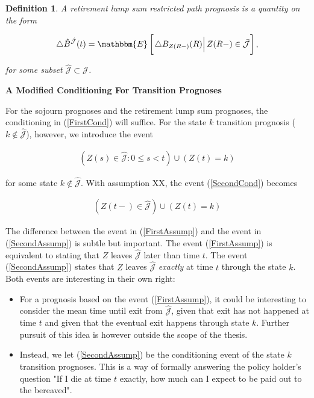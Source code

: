 \documentclass{article}
\newcommand{\1}[1]{\mathbbm{1}_{\left\lbrace #1 \right\rbrace}}
\newcommand{\econd}[2][def]{\mathbbm{E} \left[ \left. #1 \right| #2 \right]}
\theoremstyle{break}
\newtheorem{definition}{Definition}[section]
\theoremstyle{remark}
\numberwithin{equation}{section}
\begin{document}
\begin{definition} \label{DefLumpRestr}
	A retirement lump sum restricted path prognosis is a quantity on the form
	
	\begin{gather*}
		\triangle \hat{B}^{\hat{\mathcal{J}}}(t) = \econd[\triangle B_{Z(R-)}(R)]{Z(R-) \in \bar{\mathcal{J}}},
	\end{gather*}
	
	for some subset $\hat{\mathcal{J}} \subset \mathcal{J}$.
\end{definition}

\textbf{A Modified Conditioning For Transition Prognoses}

For the sojourn prognoses and the retirement lump sum prognoses, the conditioning in (\ref{FirstCond}) will suffice. For the state $k$ transition prognosis ($k \notin \hat{\mathcal{J}}$), however, we introduce the event

\begin{align} \label{SecondCond}
	\left( Z(s) \in \hat{\mathcal{J}} : 0 \leq s < t\right) \cup \left(Z(t) = k \right)
\end{align}

for some state $k \notin \hat{\mathcal{J}}$. With assumption XX, the event (\ref{SecondCond}) becomes

\begin{align} \label{SecondAssump}
	\left( Z(t-) \in \hat{\mathcal{J}}\right) \cup \left(Z(t) = k \right)
\end{align}

The difference between the event in (\ref{FirstAssump}) and the event in (\ref{SecondAssump}) is subtle but important. The event (\ref{FirstAssump}) is equivalent to stating that $Z$ leaves $ \hat{\mathcal{J}}$ later than time $t$. The event (\ref{SecondAssump}) states that $Z$ leaves $\hat{\mathcal{J}}$ \textit{exactly} at time $t$ through the state $k$. Both events are interesting in their own right:

\begin{itemize}
	\item For a prognosis based on the event (\ref{FirstAssump}), it could be interesting to consider the mean time until exit from $\hat{\mathcal{J}}$, given that exit has not happened at time $t$ and given that the eventual exit happens through state $k$. Further pursuit of this idea is however outside the scope of the thesis.
	\item Instead, we let (\ref{SecondAssump}) be the conditioning event of the state $k$ transition prognoses. This is a way of formally answering the policy holder's question "If I die at time $t$ exactly, how much can I expect to be paid out to the bereaved".
\end{itemize}
\end{document}
